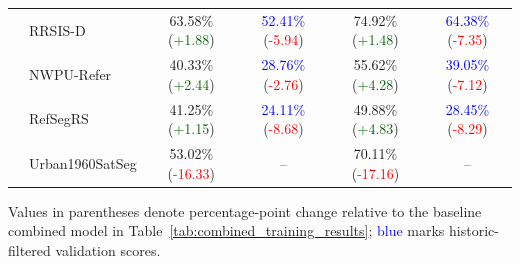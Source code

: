 \begin{table}[t]
\begin{tabular}{@{}llcccc@{}}
 & RRSIS-D & 63.58\% (\textcolor{darkgreen}{+1.88}) & \textcolor{blue}{52.41\%} (\textcolor{red}{-5.94}) & 74.92\% (\textcolor{darkgreen}{+1.48}) & \textcolor{blue}{64.38\%} (\textcolor{red}{-7.35}) \\
 & NWPU-Refer & 40.33\% (\textcolor{darkgreen}{+2.44}) & \textcolor{blue}{28.76\%} (\textcolor{red}{-2.76}) & 55.62\% (\textcolor{darkgreen}{+4.28}) & \textcolor{blue}{39.05\%} (\textcolor{red}{-7.12}) \\
 & RefSegRS & 41.25\% (\textcolor{darkgreen}{+1.15}) & \textcolor{blue}{24.11\%} (\textcolor{red}{-8.68}) & 49.88\% (\textcolor{darkgreen}{+4.83}) & \textcolor{blue}{28.45\%} (\textcolor{red}{-8.29}) \\
 & Urban1960SatSeg & 53.02\% (\textcolor{red}{-16.33}) & -- & 70.11\% (\textcolor{red}{-17.16}) & -- \\
\bottomrule
\end{tabular}
\renewcommand{\arraystretch}{1}
\end{table}

Values in parentheses denote percentage-point change relative to the baseline combined model in Table~\ref{tab:combined_training_results}; \textcolor{blue}{blue} marks historic-filtered validation scores.